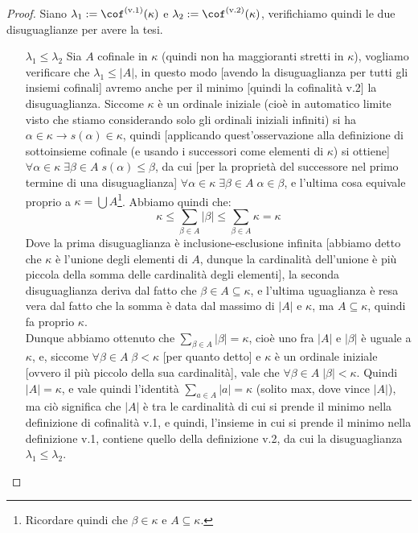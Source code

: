 \documentclass[11pt]{scrartcl}
\begin{document}
\begin{proof}
	Siano $\lambda_1 := \cof^{\text{(v.1)}}(\kappa)$ e $\lambda_2 := \cof^{\text{(v.2)}}(\kappa)$, verifichiamo quindi le due disuguaglianze per avere la tesi.
	\begin{itemize}
		\item[$\boxed{\lambda_1 \leq \lambda_2}$] Sia $A$ cofinale in $\kappa$ (quindi non ha maggioranti stretti in $\kappa$), vogliamo verificare che $\lambda_1 \leq |A|$, in questo modo [avendo la disuguaglianza per tutti gli insiemi cofinali] avremo anche per il minimo [quindi la cofinalità v.2] la disuguaglianza. Siccome 
		$\kappa$ è un ordinale iniziale (cioè in automatico limite visto che stiamo considerando solo gli ordinali iniziali infiniti) si ha $\alpha \in \kappa \rightarrow s(\alpha) \in \kappa$, quindi [applicando quest'osservazione alla definizione di sottoinsieme cofinale 
		(e usando i successori come elementi di $\kappa$) si ottiene] $\forall \alpha \in \kappa \; \exists \beta \in A \; s(\alpha) \leq \beta$, da cui [per la proprietà del successore nel primo termine di una disuguaglianza] $\forall \alpha \in \kappa \; \exists \beta \in A \; \alpha \in \beta$,
		e l'ultima cosa equivale proprio a $\kappa = \bigcup A$\footnote{Ricordare quindi che $\beta \in \kappa$ e $A \subseteq \kappa$.}. Abbiamo quindi che:
		\[ \kappa \leq \sum_{\beta \in A} |\beta| \leq \sum_{\beta \in A} \kappa = \kappa
			\]
		Dove la prima disuguaglianza è inclusione-esclusione infinita [abbiamo detto che $\kappa$ è l'unione degli elementi di $A$, dunque la cardinalità dell'unione è più piccola della somma delle cardinalità degli elementi], la seconda disuguaglianza deriva dal fatto che $\beta \in A \subseteq \kappa$, e l'ultima uguaglianza è resa vera dal fatto che
		la somma è data dal massimo di $|A|$ e $\kappa$, ma $A \subseteq \kappa$, quindi fa proprio $\kappa$.\\
		Dunque abbiamo ottenuto che $\sum_{\beta \in A} |\beta| = \kappa$, cioè uno fra $|A|$ e $|\beta|$ è uguale a $\kappa$, e, siccome $\forall \beta \in A \; \beta < \kappa$ [per quanto detto] e $\kappa$ è un ordinale iniziale [ovvero il più piccolo della sua cardinalità], vale che $\forall \beta \in A \; |\beta| < \kappa$.
		Quindi $|A| = \kappa$, e vale quindi l'identità $\sum_{a \in A} |a| = \kappa$ (solito max, dove vince $|A|$), ma ciò significa che $|A|$ è tra le cardinalità di cui si prende il minimo nella definizione di cofinalità v.1, e quindi, l'insieme in cui si prende il minimo nella definizione v.1, contiene quello della definizione v.2, da cui la disuguaglianza $\lambda_1 \leq \lambda_2$.

\end{itemize}
\end{proof}
\end{document}
